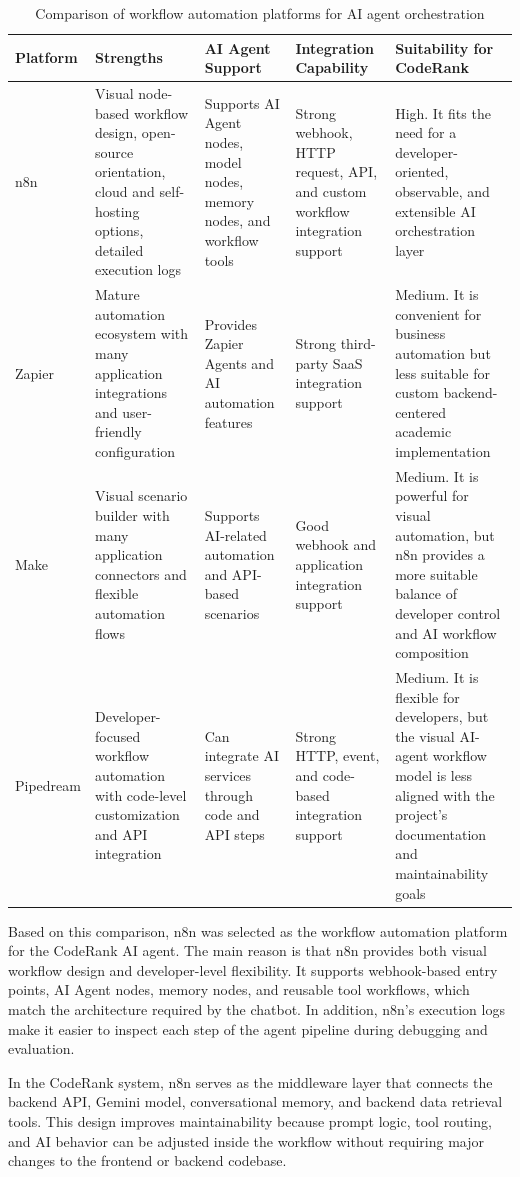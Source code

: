 \begin{table}[H]
\centering
\caption{Comparison of workflow automation platforms for AI agent orchestration}
\label{tab:workflow-automation-comparison}
\small
\renewcommand{\arraystretch}{1.25}
\begin{tabular}{|p{2.1cm}|p{2.55cm}|p{2.55cm}|p{2.55cm}|p{2.55cm}|}
\hline
\textbf{Platform} & \textbf{Strengths} & \textbf{AI Agent Support} & \textbf{Integration Capability} & \textbf{Suitability for CodeRank} \\
\hline
n8n & Visual node-based workflow design, open-source orientation, cloud and self-hosting options, detailed execution logs & Supports AI Agent nodes, model nodes, memory nodes, and workflow tools & Strong webhook, HTTP request, API, and custom workflow integration support & High. It fits the need for a developer-oriented, observable, and extensible AI orchestration layer \\
\hline
Zapier & Mature automation ecosystem with many application integrations and user-friendly configuration & Provides Zapier Agents and AI automation features & Strong third-party SaaS integration support & Medium. It is convenient for business automation but less suitable for custom backend-centered academic implementation \\
\hline
Make & Visual scenario builder with many application connectors and flexible automation flows & Supports AI-related automation and API-based scenarios & Good webhook and application integration support & Medium. It is powerful for visual automation, but n8n provides a more suitable balance of developer control and AI workflow composition \\
\hline
Pipedream & Developer-focused workflow automation with code-level customization and API integration & Can integrate AI services through code and API steps & Strong HTTP, event, and code-based integration support & Medium. It is flexible for developers, but the visual AI-agent workflow model is less aligned with the project's documentation and maintainability goals \\
\hline
\end{tabular}
\end{table}

Based on this comparison, n8n was selected as the workflow automation platform for the CodeRank AI agent. The main reason is that n8n provides both visual workflow design and developer-level flexibility. It supports webhook-based entry points, AI Agent nodes, memory nodes, and reusable tool workflows, which match the architecture required by the chatbot. In addition, n8n's execution logs make it easier to inspect each step of the agent pipeline during debugging and evaluation.

In the CodeRank system, n8n serves as the middleware layer that connects the backend API, Gemini model, conversational memory, and backend data retrieval tools. This design improves maintainability because prompt logic, tool routing, and AI behavior can be adjusted inside the workflow without requiring major changes to the frontend or backend codebase.
